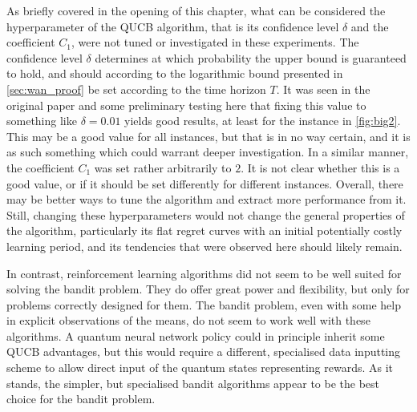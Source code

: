 As briefly covered in the opening of this chapter, what can be considered the hyperparameter of the QUCB algorithm, that is its confidence level $\delta$ and the coefficient $C_1$, were not tuned or investigated in these experiments.
The confidence level $\delta$ determines at which probability the upper bound is guaranteed to hold, and should according to the logarithmic bound presented in \cref{sec:wan_proof} be set according to the time horizon $T$.
It was seen in the original paper and some preliminary testing here that fixing this value to something like $\delta = 0.01$ yields good results, at least for the instance in \cref{fig:big2}.
This may be a good value for all instances, but that is in no way certain, and it is as such something which could warrant deeper investigation.
In a similar manner, the coefficient $C_1$ was set rather arbitrarily to $2$.
It is not clear whether this is a good value, or if it should be set differently for different instances.
Overall, there may be better ways to tune the algorithm and extract more performance from it.
Still, changing these hyperparameters would not change the general properties of the algorithm, particularly its flat regret curves with an initial potentially costly learning period, and its tendencies that were observed here should likely remain.

In contrast, reinforcement learning algorithms did not seem to be well suited for solving the bandit problem.
They do offer great power and flexibility, but only for problems correctly designed for them.
The bandit problem, even with some help in explicit observations of the means, do not seem to work well with these algorithms.
A quantum neural network policy could in principle inherit some QUCB advantages, but this would require a different, specialised data inputting scheme to allow direct input of the quantum states representing rewards.
As it stands, the simpler, but specialised bandit algorithms appear to be the best choice for the bandit problem.